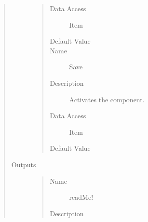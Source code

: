 \documentclass[letterpaper,10pt,english]{sphinxmanual}
\begin{document}
\begin{quote}
\begin{description}
\begin{quote}
\begin{description}
\item[{Data Access}] \leavevmode
Item

\item[{Default Value}] \leavevmode
{}

\item[{Name}] \leavevmode
Save

\item[{Description}] \leavevmode
Activates the component.

\item[{Data Access}] \leavevmode
Item

\item[{Default Value}] \leavevmode
{}

\end{description}\end{quote}

\item[{Outputs}] \leavevmode\begin{quote}\begin{description}
\item[{Name}] \leavevmode
readMe!

\item[{Description}] \leavevmode
{}

\end{description}\end{quote}

\end{description}\end{quote}
\end{document}
